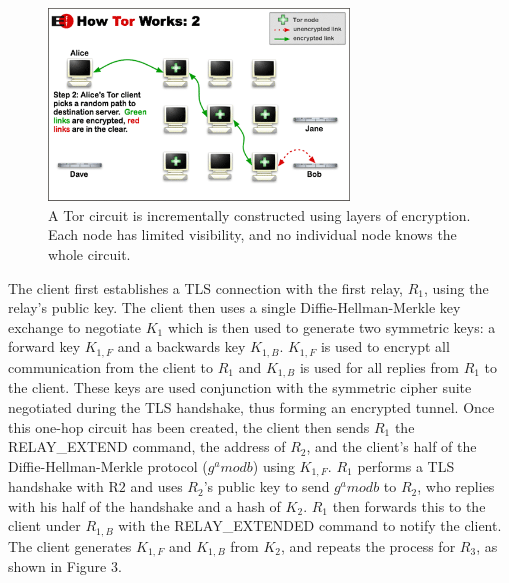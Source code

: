 \documentclass[journal]{IEEEtran}
\begin{document}
\begin{figure}[htbp]
\centering
\begin{minipage}{8 cm}
    \includegraphics[width=80mm]{resources/circuit-building-2.png}
    \caption{A Tor circuit is incrementally constructed using layers of encryption. Each node has limited visibility, and no individual node knows the whole circuit.\cite{TorOverview}}
\end{minipage}
\end{figure}

The client first establishes a TLS connection with the first relay, $R_{1}$, using the relay's public key. The client then uses a single Diffie-Hellman-Merkle key exchange to negotiate $K_{1}$ which is then used to generate two symmetric keys: a forward key $K_{1,F}$ and a backwards key $K_{1,B}$. $K_{1,F}$ is used to encrypt all communication from the client to $R_{1}$ and $K_{1,B}$ is used for all replies from $R_{1}$ to the client. These keys are used conjunction with the symmetric cipher suite negotiated during the TLS handshake, thus forming an encrypted tunnel. Once this one-hop circuit has been created, the client then sends $R_{1}$ the RELAY\_EXTEND command, the address of $R_{2}$, and the client's half of the Diffie-Hellman-Merkle protocol ($ g^a mod b $) using $K_{1,F}$. $R_{1}$ performs a TLS handshake with R${2}$ and uses $R_{2}$'s public key to send $ g^a mod b $ to $R_{2}$, who replies with his half of the handshake and a hash of $K_{2}$. $R_{1}$ then forwards this to the client under $R_{1,B}$ with the RELAY\_EXTENDED command to notify the client. The client generates $K_{1,F}$ and $K_{1,B}$ from $K_{2}$, and repeats the process for $R_{3}$,\cite{Ling2012} as shown in Figure 3.
\end{document}
